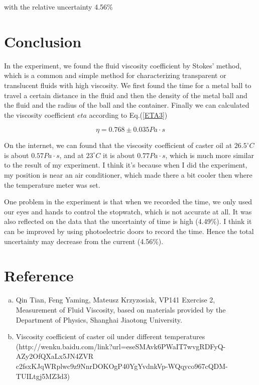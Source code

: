 \documentclass{article}
\begin{document}
with the relative uncertainty 4.56\%

\section{Conclusion}
In the experiment, we found the fluid viscosity coefficient by Stokes' method, which is a common and simple method for characterizing transparent or translucent fluids with high viscosity. We first found the time for a metal ball to travel a certain distance in the fluid and then the density of the metal ball and the fluid and the radius of the ball and the container. Finally we can calculated the viscosity coefficient $eta$ according to Eq.(\ref{ETA3})

$$\eta=0.768\pm0.035Pa\cdot s$$

On the internet, we can found that the viscosity coefficient of caster oil at $26.5^{\circ}C$ is about $0.57Pa\cdot s$, and at $23^{\circ}C$ it is about $0.77Pa\cdot s$, which is much more similar to the result of my experiment. I think it's because when I did the experiment, my position is near an air conditioner, which made there a bit cooler then where the temperature meter was set. 

One problem in the experiment is that when we recorded the time, we only used our eyes and hands to control the stopwatch, which is not accurate at all. It was also reflected on the data that the uncertainty of time is high (4.49\%). I think it can be improved by using photoelectric doors to record the time. Hence the total uncertainty may decrease from the current (4.56\%).


\section{Reference}

\begin{enumerate}[(a)]
	\item
	Qin Tian, Feng Yaming, Mateusz Krzyzosiak, VP141 Exercise 2, Measurement of Fluid Viscosity, based on materials provided by the Department of Physics, Shanghai Jiaotong University.
	\item
	Viscosity coefficient of caster oil under different temperatures\\
	(http://wenku.baidu.com/link?url=eseSMAvk6PWaIT7wvgRDFyQ-AZy2OfQXaLx5JN4ZVR\\c2fsxKJqWRplwc9z9NnrDOKOgP40YgYvdnkVp-WQqyco967cQDM-TUILtgj5MZ3d3)
\end{enumerate}
\end{document}
